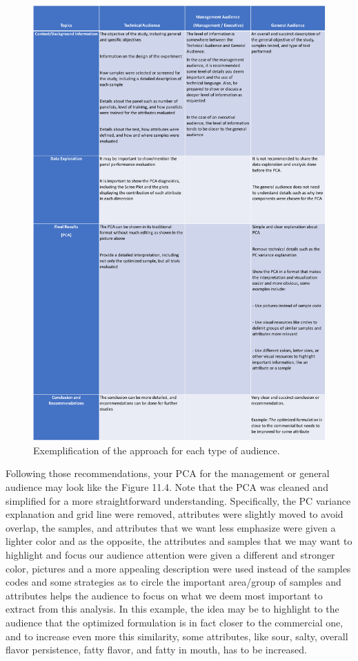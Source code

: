 \documentclass[
]{book}
\begin{document}
\begin{figure}

{\centering \includegraphics[width=61.43in]{images/table_value_delivery_2} 

}

\caption{Exemplification of the approach for each type of audience.}\label{fig:table}
\end{figure}

Following those recommendations, your PCA for the management or general audience may look like the Figure 11.4. Note that the PCA was cleaned and simplified for a more straightforward understanding. Specifically, the PC variance explanation and grid line were removed, attributes were slightly moved to avoid overlap, the samples, and attributes that we want less emphasize were given a lighter color and as the opposite, the attributes and samples that we may want to highlight and focus our audience attention were given a different and stronger color, pictures and a more appealing description were used instead of the samples codes and some strategies as to circle the important area/group of samples and attributes helps the audience to focus on what we deem most important to extract from this analysis. In this example, the idea may be to highlight to the audience that the optimized formulation is in fact closer to the commercial one, and to increase even more this similarity, some attributes, like sour, salty, overall flavor persistence, fatty flavor, and fatty in mouth, has to be increased.
\end{document}
